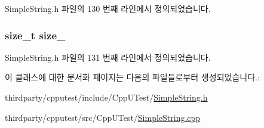 Simple\+String.\+h 파일의 130 번째 라인에서 정의되었습니다.

\subsubsection[{\texorpdfstring{size\+\_\+}{size_}}]{\setlength{\rightskip}{0pt plus 5cm}size\+\_\+t size\+\_\+\hspace{0.3cm}{\ttfamily [private]}}\hypertarget{class_simple_string_collection_a5f31775800bbb46b35b5791def1f3acc}{}\label{class_simple_string_collection_a5f31775800bbb46b35b5791def1f3acc}


Simple\+String.\+h 파일의 131 번째 라인에서 정의되었습니다.



이 클래스에 대한 문서화 페이지는 다음의 파일들로부터 생성되었습니다.\+:\begin{DoxyCompactItemize}
\item 
thirdparty/cpputest/include/\+Cpp\+U\+Test/\hyperlink{_simple_string_8h}{Simple\+String.\+h}\item 
thirdparty/cpputest/src/\+Cpp\+U\+Test/\hyperlink{_simple_string_8cpp}{Simple\+String.\+cpp}\end{DoxyCompactItemize}
